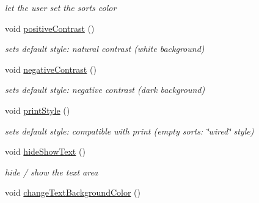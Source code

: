 \begin{DoxyCompactItemize}
\begin{DoxyCompactList}\small\item\em let the user set the sorts color \end{DoxyCompactList}\item 
\hypertarget{class_main_window_a53a978130fe29018994d68086887cec6}{void \hyperlink{class_main_window_a53a978130fe29018994d68086887cec6}{positive\-Contrast} ()}\label{class_main_window_a53a978130fe29018994d68086887cec6}

\begin{DoxyCompactList}\small\item\em sets default style\-: natural contrast (white background) \end{DoxyCompactList}\item 
\hypertarget{class_main_window_af24af65044c4d11840848c7e88aee5ab}{void \hyperlink{class_main_window_af24af65044c4d11840848c7e88aee5ab}{negative\-Contrast} ()}\label{class_main_window_af24af65044c4d11840848c7e88aee5ab}

\begin{DoxyCompactList}\small\item\em sets default style\-: negative contrast (dark background) \end{DoxyCompactList}\item 
\hypertarget{class_main_window_acff3aa2177db565ca2e2ced7a70ca46e}{void \hyperlink{class_main_window_acff3aa2177db565ca2e2ced7a70ca46e}{print\-Style} ()}\label{class_main_window_acff3aa2177db565ca2e2ced7a70ca46e}

\begin{DoxyCompactList}\small\item\em sets default style\-: compatible with print (empty sorts\-: \char`\"{}wired\char`\"{} style) \end{DoxyCompactList}\item 
\hypertarget{class_main_window_ad76e17f0b71ff5e14addac21b81551b7}{void \hyperlink{class_main_window_ad76e17f0b71ff5e14addac21b81551b7}{hide\-Show\-Text} ()}\label{class_main_window_ad76e17f0b71ff5e14addac21b81551b7}

\begin{DoxyCompactList}\small\item\em hide / show the text area \end{DoxyCompactList}\item 
\hypertarget{class_main_window_affc0ddbc2bff4b3fab7c95df8ec4322b}{void \hyperlink{class_main_window_affc0ddbc2bff4b3fab7c95df8ec4322b}{change\-Text\-Background\-Color} ()}\label{class_main_window_affc0ddbc2bff4b3fab7c95df8ec4322b}


\end{DoxyCompactItemize}

